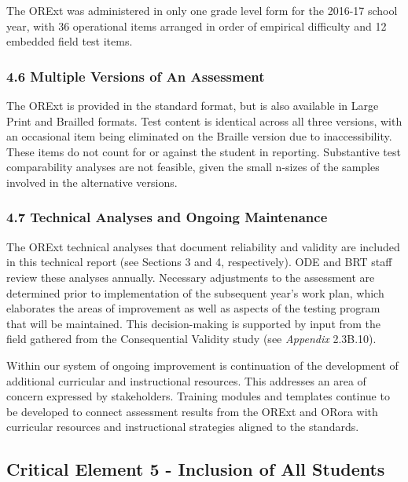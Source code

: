 \documentclass[]{article}
\begin{document}
The ORExt was administered in only one grade level form for the 2016-17
school year, with 36 operational items arranged in order of empirical
difficulty and 12 embedded field test items.

\subsubsection{4.6 Multiple Versions of An
Assessment}\label{multiple-versions-of-an-assessment}

The ORExt is provided in the standard format, but is also available in
Large Print and Brailled formats. Test content is identical across all
three versions, with an occasional item being eliminated on the Braille
version due to inaccessibility. These items do not count for or against
the student in reporting. Substantive test comparability analyses are
not feasible, given the small n-sizes of the samples involved in the
alternative versions.

\subsubsection{4.7 Technical Analyses and Ongoing
Maintenance}\label{technical-analyses-and-ongoing-maintenance}

The ORExt technical analyses that document reliability and validity are
included in this technical report (see Sections 3 and 4, respectively).
ODE and BRT staff review these analyses annually. Necessary adjustments
to the assessment are determined prior to implementation of the
subsequent year's work plan, which elaborates the areas of improvement
as well as aspects of the testing program that will be maintained. This
decision-making is supported by input from the field gathered from the
Consequential Validity study (see \emph{Appendix} 2.3B.10).

Within our system of ongoing improvement is continuation of the
development of additional curricular and instructional resources. This
addresses an area of concern expressed by stakeholders. Training modules
and templates continue to be developed to connect assessment results
from the ORExt and ORora with curricular resources and instructional
strategies aligned to the standards.

\subsection{Critical Element 5 - Inclusion of All
Students}\label{critical-element-5---inclusion-of-all-students}
\end{document}
